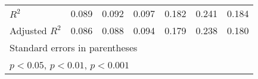 {\begin{tabular}{l*{6}{c}}
\(R^{2}\)           &       0.089         &       0.092         &       0.097         &       0.182         &       0.241         &       0.184         \\
Adjusted \(R^{2}\)  &       0.086         &       0.088         &       0.094         &       0.179         &       0.238         &       0.180         \\
\bottomrule
\multicolumn{7}{l}{\footnotesize Standard errors in parentheses}\\
\multicolumn{7}{l}{\footnotesize \sym{*} \(p<0.05\), \sym{**} \(p<0.01\), \sym{***} \(p<0.001\)}\\
\end{tabular}
}
